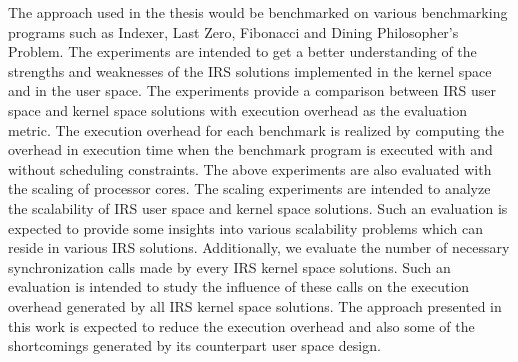 The approach used in the thesis would be benchmarked on various benchmarking programs such as Indexer, Last Zero, Fibonacci and Dining Philosopher's Problem. 
The experiments are intended to get a better understanding of the strengths and weaknesses of the IRS solutions implemented in the kernel space and in the user space. 
The experiments provide a comparison between IRS user space and kernel space solutions with execution overhead as the evaluation metric. 
The execution overhead for each benchmark is realized by computing the overhead in execution time when the benchmark program is executed with and without scheduling constraints. 
The above experiments are also evaluated with the scaling of processor cores. 
The scaling experiments are intended to analyze the scalability of IRS user space and kernel space solutions. 
Such an evaluation is expected to provide some insights into various scalability problems which can reside in various IRS solutions. 
Additionally, we evaluate the number of necessary synchronization calls made by every IRS kernel space solutions. 
Such an evaluation is intended to study the influence of these calls on the execution overhead generated by all IRS kernel space solutions. 
The approach presented in this work is expected to reduce the execution overhead and also some of the shortcomings generated by its counterpart user space design. 
